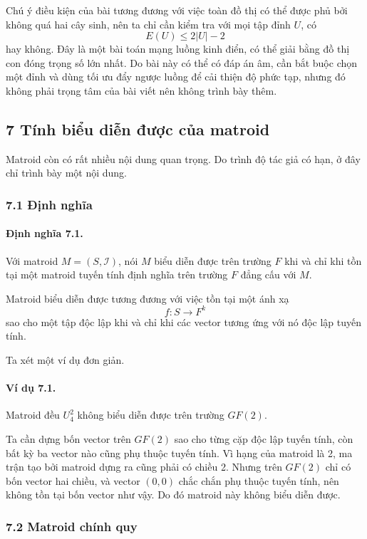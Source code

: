 \documentclass[11pt]{article}
\begin{document}
Chú ý điều kiện của bài tương đương với việc toàn đồ thị có thể được phủ bởi
không quá hai cây sinh, nên ta chỉ cần kiểm tra với mọi tập đỉnh \(U\), có
\[
  E(U)\le 2|U|-2
\]
hay không. Đây là một bài toán mạng luồng kinh điển, có thể giải bằng đồ thị con
đóng trọng số lớn nhất. Do bài này có thể có đáp án âm, cần bắt buộc chọn một
đỉnh và dùng tối ưu đẩy ngược luồng để cải thiện độ phức tạp, nhưng đó không
phải trọng tâm của bài viết nên không trình bày thêm.

\subsection*{7 Tính biểu diễn được của matroid}

Matroid còn có rất nhiều nội dung quan trọng. Do trình độ tác giả có hạn, ở đây
chỉ trình bày một nội dung.

\subsubsection*{7.1 Định nghĩa}

\paragraph{Định nghĩa 7.1.}
Với matroid \(M=(S,\mathcal I)\), nói \(M\) biểu diễn được trên trường \(F\) khi
và chỉ khi tồn tại một matroid tuyến tính định nghĩa trên trường \(F\) đẳng cấu
với \(M\).

Matroid biểu diễn được tương đương với việc tồn tại một ánh xạ
\[
  f:S\to F^k
\]
sao cho một tập độc lập khi và chỉ khi các vector tương ứng với nó độc lập tuyến
tính.

Ta xét một ví dụ đơn giản.

\paragraph{Ví dụ 7.1.}
Matroid đều \(U_4^2\) không biểu diễn được trên trường \(GF(2)\).

Ta cần dựng bốn vector trên \(GF(2)\) sao cho từng cặp độc lập tuyến tính, còn
bất kỳ ba vector nào cũng phụ thuộc tuyến tính. Vì hạng của matroid là 2, ma
trận tạo bởi matroid dựng ra cũng phải có chiều 2. Nhưng trên \(GF(2)\) chỉ có
bốn vector hai chiều, và vector \((0,0)\) chắc chắn phụ thuộc tuyến tính, nên
không tồn tại bốn vector như vậy. Do đó matroid này không biểu diễn được.

\subsubsection*{7.2 Matroid chính quy}
\end{document}
